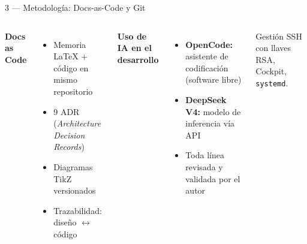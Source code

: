 \begin{frame}[fragile]{3 — Metodología: Docs-as-Code y Git}
  \hypertarget{s:metodologia}{}
  \begin{columns}[T]
    \small
    \textbf{Docs as Code}
    \begin{itemize}
      \item Memoria \LaTeX{} + código en mismo repositorio
      \item 9 ADR (\textit{Architecture Decision Records})
      \item Diagramas TikZ versionados
      \item Trazabilidad: diseño $\leftrightarrow$ código
    \end{itemize}

    \footnotesize
    \textbf{Uso de IA en el desarrollo}
    \begin{itemize}
      \item \textbf{OpenCode:} asistente de codificación (software libre)
      \item \textbf{DeepSeek V4:} modelo de inferencia vía API
      \item \alert{Toda línea revisada y validada por el autor}
    \end{itemize}

    \begin{exampleblock}{Gestión}
      SSH con llaves RSA, Cockpit, \texttt{systemd}.
    \end{exampleblock}
  \end{columns}
\end{frame}
